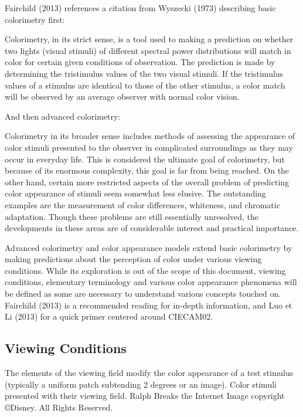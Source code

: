Fairchild (2013) references a citation from Wyszecki (1973) describing basic colorimetry first:

Colorimetry, in its strict sense, is a tool used to making a prediction on whether two lights (visual stimuli) of different spectral power distributions will match in color for certain given conditions of observation. The prediction is made by determining the tristimulus values of the two visual stimuli. If the tristimulus values of a stimulus are identical to those of the other stimulus, a color match will be observed by an average observer with normal color vision. 

And then advanced colorimetry:

Colorimetry in its broader sense includes methods of assessing the appearance of color stimuli presented to the observer in complicated surroundings as they may occur in everyday life. This is considered the ultimate goal of colorimetry, but because of its enormous complexity, this goal is far from being reached. On the other hand, certain more restricted aspects of the overall problem of predicting color appearance of stimuli seem somewhat less elusive. The outstanding examples are the measurement of color differences, whiteness, and chromatic adaptation. Though these problems are still essentially unresolved, the developments in these areas are of considerable interest and practical importance.

Advanced colorimetry and color appearance models extend basic colorimetry by making predictions about the perception of color under various viewing conditions. While its exploration is out of the scope of this document, viewing conditions, elementary terminology and various color appearance phenomena will be defined as some are necessary to understand various concepts touched on. Fairchild (2013) is a recommended reading for in-depth information, and Luo et Li (2013) for a quick primer centered around CIECAM02.

\subsection{Viewing Conditions}

The elements of the viewing field modify the color appearance of a test stimulus (typically a uniform patch subtending 2 degrees or an image).
Color stimuli presented with their viewing field. 
Ralph Breaks the Internet Image copyright ©Disney. All Rights Reserved.

